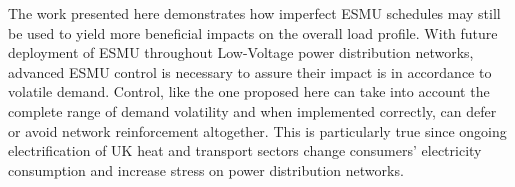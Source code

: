 The work presented here demonstrates how imperfect ESMU schedules may still be used to yield more beneficial impacts on the overall load profile.
With future deployment of ESMU throughout Low-Voltage power distribution networks, advanced ESMU control is necessary to assure their impact is in accordance to volatile demand.
Control, like the one proposed here can take into account the complete range of demand volatility and when implemented correctly, can defer or avoid network reinforcement altogether.
This is particularly true since ongoing electrification of UK heat and transport sectors change consumers' electricity consumption and increase stress on power distribution networks.
